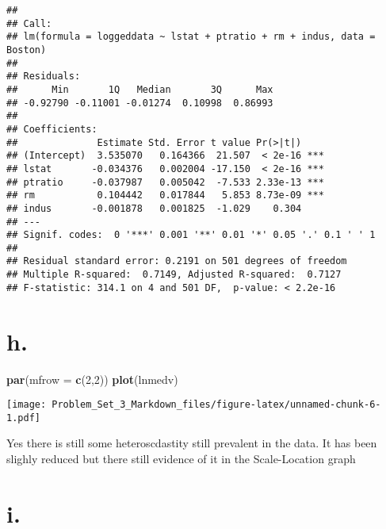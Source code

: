 \documentclass[]{article}
\newenvironment{Shaded}{\begin{snugshade}}{\end{snugshade}}
\newcommand{\KeywordTok}[1]{\textcolor[rgb]{0.13,0.29,0.53}{\textbf{#1}}}
\newcommand{\DataTypeTok}[1]{\textcolor[rgb]{0.13,0.29,0.53}{#1}}
\newcommand{\DecValTok}[1]{\textcolor[rgb]{0.00,0.00,0.81}{#1}}
\newcommand{\StringTok}[1]{\textcolor[rgb]{0.31,0.60,0.02}{#1}}
\newcommand{\OperatorTok}[1]{\textcolor[rgb]{0.81,0.36,0.00}{\textbf{#1}}}
\newcommand{\NormalTok}[1]{#1}
\begin{document}
\begin{verbatim}
## 
## Call:
## lm(formula = loggeddata ~ lstat + ptratio + rm + indus, data = Boston)
## 
## Residuals:
##      Min       1Q   Median       3Q      Max 
## -0.92790 -0.11001 -0.01274  0.10998  0.86993 
## 
## Coefficients:
##              Estimate Std. Error t value Pr(>|t|)    
## (Intercept)  3.535070   0.164366  21.507  < 2e-16 ***
## lstat       -0.034376   0.002004 -17.150  < 2e-16 ***
## ptratio     -0.037987   0.005042  -7.533 2.33e-13 ***
## rm           0.104442   0.017844   5.853 8.73e-09 ***
## indus       -0.001878   0.001825  -1.029    0.304    
## ---
## Signif. codes:  0 '***' 0.001 '**' 0.01 '*' 0.05 '.' 0.1 ' ' 1
## 
## Residual standard error: 0.2191 on 501 degrees of freedom
## Multiple R-squared:  0.7149, Adjusted R-squared:  0.7127 
## F-statistic: 314.1 on 4 and 501 DF,  p-value: < 2.2e-16
\end{verbatim}

\section{h.}\label{h.}

\begin{Shaded}
\begin{Highlighting}[]
\KeywordTok{par}\NormalTok{(}\DataTypeTok{mfrow =} \KeywordTok{c}\NormalTok{(}\DecValTok{2}\NormalTok{,}\DecValTok{2}\NormalTok{))}
\KeywordTok{plot}\NormalTok{(lnmedv)}
\end{Highlighting}
\end{Shaded}

\texttt{[image: Problem\_Set\_3\_Markdown\_files/figure-latex/unnamed-chunk-6-1.pdf]}

Yes there is still some heteroscdastity still prevalent in the data. It
has been slighly reduced but there still evidence of it in the
Scale-Location graph

\section{i.}\label{i.}

\begin{Shaded}
\end{Shaded}
\end{document}
